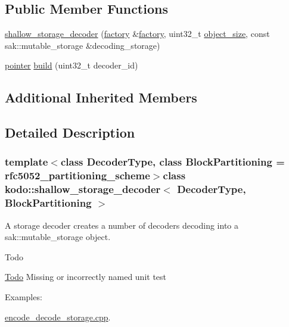 \subsection*{Public Member Functions}
\begin{DoxyCompactItemize}
\item 
\hyperlink{classkodo_1_1shallow__storage__decoder_a50f1f5adf7e82a9892d08d687c7c3673}{shallow\-\_\-storage\-\_\-decoder} (\hyperlink{classkodo_1_1shallow__storage__decoder_1_1factory}{factory} \&\hyperlink{classkodo_1_1shallow__storage__decoder_1_1factory}{factory}, uint32\-\_\-t \hyperlink{classkodo_1_1object__decoder_ae4759b34a39ae09018af600dbc6095e7}{object\-\_\-size}, const sak\-::mutable\-\_\-storage \&decoding\-\_\-storage)
\item 
\hyperlink{classkodo_1_1object__decoder_a2d53e4d4369d535ca146ac5c912d9310}{pointer} \hyperlink{classkodo_1_1shallow__storage__decoder_a7103bfbd27b91e4ac01e80c5b863e24d}{build} (uint32\-\_\-t decoder\-\_\-id)
\begin{DoxyCompactList}\small\item\em \end{DoxyCompactList}\end{DoxyCompactItemize}
\subsection*{Additional Inherited Members}


\subsection{Detailed Description}
\subsubsection*{template$<$class Decoder\-Type, class Block\-Partitioning = rfc5052\-\_\-partitioning\-\_\-scheme$>$class kodo\-::shallow\-\_\-storage\-\_\-decoder$<$ Decoder\-Type, Block\-Partitioning $>$}

A storage decoder creates a number of decoders decoding into a sak\-::mutable\-\_\-storage object. 

\begin{DoxyRefDesc}{Todo}
\item[\hyperlink{todo__todo000055}{Todo}]Missing or incorrectly named unit test \end{DoxyRefDesc}
\begin{Desc}
\item[Examples\-: ]\par
\hyperlink{encode_decode_storage_8cpp-example}{encode\-\_\-decode\-\_\-storage.\-cpp}.\end{Desc}


